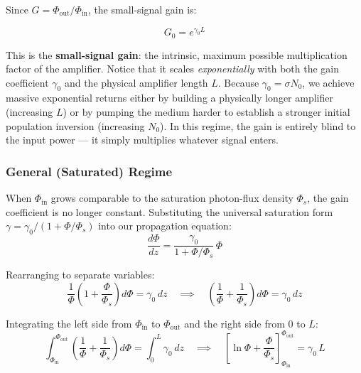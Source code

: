 Since $G = \Phi_\text{out}/\Phi_\text{in}$, the small-signal gain is:
\begin{keyresult}
    \begin{equation}
        G_0 = e^{\gamma_0 L}
    \end{equation}
\end{keyresult}

This is the \textbf{small-signal gain}: the intrinsic, maximum possible multiplication factor of the amplifier. Notice that it scales \emph{exponentially} with both the gain coefficient $\gamma_0$ and the physical amplifier length $L$. Because $\gamma_0 = \sigma N_0$, we achieve massive exponential returns either by building a physically longer amplifier (increasing $L$) or by pumping the medium harder to establish a stronger initial population inversion (increasing $N_0$). In this regime, the gain is entirely blind to the input power — it simply multiplies whatever signal enters.

\subsubsection*{General (Saturated) Regime}

When $\Phi_\text{in}$ grows comparable to the saturation photon-flux density $\Phi_s$, the gain coefficient is no longer constant. Substituting the universal saturation form $\gamma = \gamma_0 / (1+\Phi/\Phi_s)$ into our propagation equation:
\begin{equation*}
    \frac{d\Phi}{dz} = \frac{\gamma_0}{1+\Phi/\Phi_s}\,\Phi
\end{equation*}

Rearranging to separate variables:
\begin{equation*}
    \frac{1}{\Phi}\left(1 + \frac{\Phi}{\Phi_s}\right) d\Phi = \gamma_0\,dz
    \quad\implies\quad
    \left(\frac{1}{\Phi} + \frac{1}{\Phi_s}\right) d\Phi = \gamma_0\,dz
\end{equation*}

Integrating the left side from $\Phi_\text{in}$ to $\Phi_\text{out}$ and the right side from $0$ to $L$:
\begin{equation*}
    \int_{\Phi_\text{in}}^{\Phi_\text{out}} \left(\frac{1}{\Phi} + \frac{1}{\Phi_s}\right) d\Phi = \int_0^L \gamma_0\,dz
    \quad\implies\quad
    \left[\ln \Phi + \frac{\Phi}{\Phi_s}\right]_{\Phi_\text{in}}^{\Phi_\text{out}} = \gamma_0\,L
\end{equation*}

